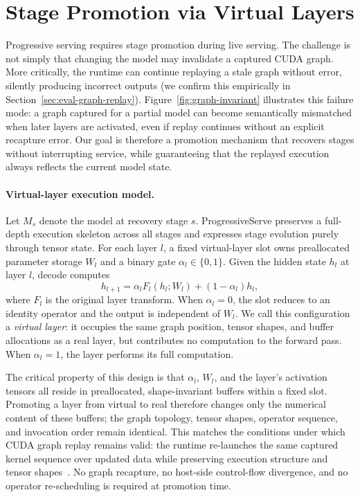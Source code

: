\documentclass[sigplan,anonymous,review,nonacm]{acmart}
\begin{document}
\section{Stage Promotion via Virtual Layers}

\label{sec:cuda_stable_transition}

Progressive serving requires stage promotion during live serving. The challenge is not simply that changing the model may invalidate a captured CUDA graph. More critically, the runtime can continue replaying a stale graph without error, silently producing incorrect outputs (we confirm this empirically in Section~\ref{sec:eval-graph-replay}). 
Figure~\ref{fig:graph-invariant} illustrates this failure mode: a graph captured for a partial model can become semantically mismatched when later layers are activated, even if replay continues without an explicit recapture error.
Our goal is therefore a promotion mechanism that recovers stages without interrupting service, while guaranteeing that the replayed execution always reflects the current model state.



\paragraph{Virtual-layer execution model.}
Let $M_s$ denote the model at recovery stage $s$. ProgressiveServe preserves a full-depth execution skeleton across all stages and expresses stage evolution purely through tensor state. For each layer $l$, a fixed virtual-layer slot owns preallocated parameter storage $W_l$ and a binary gate $\alpha_l \in \{0,1\}$. Given the hidden state $h_l$ at layer $l$, decode computes
\begin{equation}
h_{l+1} = \alpha_l F_l(h_l; W_l) + (1 - \alpha_l) h_l,
\end{equation}
where $F_l$ is the original layer transform. When $\alpha_l = 0$, the slot reduces to an identity operator and the output is independent of $W_l$. We call this configuration a \emph{virtual layer}: it occupies the same graph position, tensor shapes, and buffer allocations as a real layer, but contributes no computation to the forward pass. When $\alpha_l = 1$, the layer performs its full computation.

The critical property of this design is that $\alpha_l$, $W_l$, and the layer's activation tensors all reside in preallocated, shape-invariant buffers within a fixed slot. Promoting a layer from virtual to real therefore changes only the numerical content of these buffers; the graph topology, tensor shapes, operator sequence, and invocation order remain identical. This matches the conditions under which CUDA graph replay remains valid: the runtime re-launches the same captured kernel sequence over updated data while preserving execution structure and tensor shapes~\cite{nvidia_cuda_graphs}. No graph recapture, no host-side control-flow divergence, and no operator re-scheduling is required at promotion time.
\end{document}
